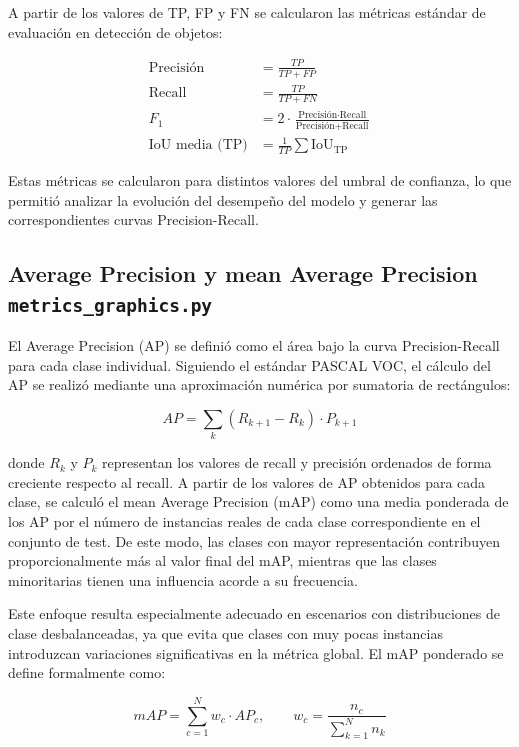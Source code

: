 \documentclass{article}
\begin{document}
	A partir de los valores de TP, FP y FN se calcularon las métricas estándar de evaluación en detección de objetos:
	
	\begin{align}
		\text{Precisión} &= \frac{TP}{TP + FP} \\
		\text{Recall} &= \frac{TP}{TP + FN} \\
		F_1 &= 2 \cdot \frac{\text{Precisión} \cdot \text{Recall}}{\text{Precisión} + \text{Recall}} \\
		\text{IoU media (TP)} &= \frac{1}{TP} \sum \text{IoU}_{\text{TP}}
	\end{align}
	
	Estas métricas se calcularon para distintos valores del umbral de confianza, lo que permitió analizar la evolución del desempeño del modelo y generar las correspondientes curvas Precision-Recall.
	
	\subsection{Average Precision y mean Average Precision \texttt{metrics\_graphics.py}}
	
	El Average Precision (AP) se definió como el área bajo la curva Precision-Recall para cada clase individual. Siguiendo el estándar PASCAL VOC, el cálculo del AP se realizó mediante una aproximación numérica por sumatoria de rectángulos:
	
	\begin{equation}
		AP = \sum_k (R_{k+1} - R_k) \cdot P_{k+1}
	\end{equation}
	
	donde $R_k$ y $P_k$ representan los valores de recall y precisión ordenados de forma creciente respecto al recall. A partir de los valores de AP obtenidos para cada clase, se calculó el mean Average Precision (mAP) como una media ponderada de los AP por el número de instancias reales de cada clase correspondiente en el conjunto de test. De este modo, las clases con mayor representación contribuyen proporcionalmente más al valor final del mAP, mientras que las clases minoritarias tienen una influencia acorde a su frecuencia.
	
	Este enfoque resulta especialmente adecuado en escenarios con distribuciones de clase desbalanceadas, ya que evita que clases con muy pocas instancias introduzcan variaciones significativas en la métrica global. El mAP ponderado se define formalmente como:
	
	\begin{equation}
		mAP = \sum_{c=1}^{N} w_c \cdot AP_c,
		\qquad
		w_c = \frac{n_c}{\sum_{k=1}^{N} n_k}
	\end{equation}
	
\end{document}
